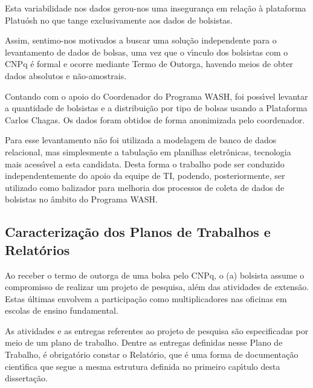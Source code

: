 \documentclass[
12pt,		%
openright,	%
twoside,  %
a4paper,			%
chapter=TITLE,		%
english,			%
french,				%
spanish,			%
brazil				%
]{USPSC-classe/USPSC}
\begin{document}
Esta variabilidade nos dados gerou-nos uma inseguran\c{c}a em rela\c{c}\~ao \`a plataforma Platu\'osh no que tange exclusivamente aos dados de bolsistas.




Assim, sentimo-nos motivados a buscar uma solu\c{c}\~ao independente para o levantamento de dados de bolsas, uma vez que o v\'{\i}nculo dos bolsistas com o CNPq \'e formal e ocorre mediante Termo de Outorga, havendo meios de obter dados absolutos e n\~ao-amostrais.




Contando com o apoio do Coordenador do Programa WASH, foi poss\'{\i}vel levantar a quantidade de bolsistas e a distribui\c{c}\~ao por tipo de bolsas usando a Plataforma Carlos Chagas. Os dados foram obtidos de forma anonimizada pelo coordenador.




Para esse levantamento n\~ao foi utilizada a modelagem de banco de dados relacional, mas simplesmente a tabula\c{c}\~ao em planilhas eletr\^onicas, tecnologia mais acess\'{\i}vel a esta candidata. Desta forma o trabalho pode ser conduzido independentemente do apoio da equipe de TI, podendo, posteriormente, ser utilizado como balizador para melhoria dos processos de coleta de dados de bolsistas no \^ambito do Programa WASH.




\subsection[Caracteriza\c{c}\~ao dos Planos de Trabalhos e Relat\'orios]{Caracteriza\c{c}\~ao dos Planos de Trabalhos e Relat\'orios}\label{Caracteriza\c{c}\~ao dos Planos de Trabalhos e Relat\'orios}
Ao receber o termo de outorga de uma bolsa pelo CNPq, o (a) bolsista assume o compromisso de realizar um projeto de pesquisa, al\'em das atividades de extens\~ao. Estas \'ultimas envolvem a participa\c{c}\~ao como multiplicadores nas oficinas em escolas de ensino fundamental.




As atividades e as entregas referentes ao projeto de pesquisa s\~ao especificadas por meio de um plano de trabalho. Dentre as entregas definidas nesse Plano de Trabalho, \'e obrigat\'orio constar o Relat\'orio, que \'e uma forma de documenta\c{c}\~ao cient\'{\i}fica que segue a mesma estrutura definida no primeiro cap\'{\i}tulo desta disserta\c{c}\~ao.
\end{document}
